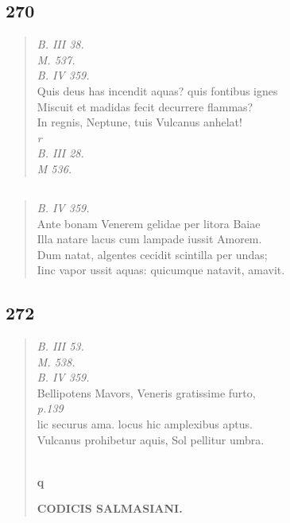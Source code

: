 \documentclass[11pt, a4paper]{report}
\begin{document}
            \subsection*{270}
      \begin{verse}
      \textit{B. III 38.} \\ \textit{M. 537.} \\ \textit{B. IV 359.} \\ Quis deus has incendit aquas? quis fontibus ignes \\ Miscuit et madidas fecit decurrere flammas? \\ In regnis, Neptune, tuis Vulcanus anhelat! \\ \textit{r} \\ \textit{B. III 28.} \\ \textit{M 536.} \\ 
      \end{verse}
  
            \subsection*{}
      \begin{verse}
      \textit{B. IV 359.} \\ Ante bonam Venerem gelidae per litora Baiae \\ Illa natare lacus cum lampade iussit Amorem. \\ Dum natat, algentes cecidit scintilla per undas; \\ Iinc vapor ussit aquas: quicumque natavit, amavit. \\ 
      \end{verse}
  
            \subsection*{272}
      \begin{verse}
      \textit{B. III 53.} \\ \textit{M. 538.} \\ \textit{B. IV 359.} \\ Bellipotens Mavors, Veneris gratissime furto, \\ \textit{p.139} \\ lic securus ama. locus hic amplexibus aptus. \\ Vulcanus prohibetur aquis, Sol pellitur umbra. \\ 
        ﻿\pagebreak 
    \begin{center} \textbf{q} \end{center}\begin{center} \textbf{CODICIS SALMASIANI.} \end{center}
      \end{verse}
  
\end{document}
